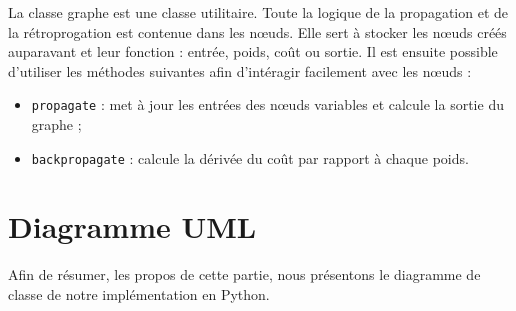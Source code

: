 La classe graphe est une classe utilitaire. Toute la logique de la propagation et de la rétroprogation est contenue dans les n\oe{}uds. Elle sert à stocker les n\oe{}uds créés auparavant et leur fonction : entrée, poids, coût ou sortie. Il est ensuite possible d'utiliser les méthodes suivantes afin d'intéragir facilement avec les n\oe{}uds :
\begin{itemize}
\item \texttt{propagate} : met à jour les entrées des n\oe{}uds variables et calcule la sortie du graphe ;
\item \texttt{backpropagate} : calcule la dérivée du coût par rapport à chaque poids.
\end{itemize} 

\section{Diagramme UML}

Afin de résumer, les propos de cette partie, nous présentons le diagramme de classe de notre implémentation en Python.

